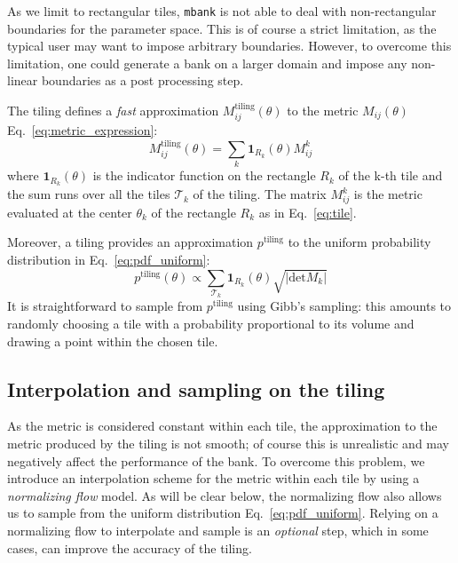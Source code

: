 \documentclass[twocolumn,showpacs,preprintnumbers,nofootinbib,prd,
superscriptaddress,10pt]{revtex4-2}
\begin{document}
As we limit to rectangular tiles, \texttt{mbank} is not able to deal with non-rectangular boundaries for the parameter space. This is of course a strict limitation, as the typical user may want to impose arbitrary boundaries. However, to overcome this limitation, one could generate a bank on a larger domain and impose any non-linear boundaries as a post processing step.

The tiling defines a {\it fast} approximation $M^{\text{tiling}}_{ij}(\theta)$ to the metric $M_{ij}(\theta)$ Eq.~\eqref{eq:metric_expression}:
\begin{equation}\label{eq:metric_tiling}
	M^\text{tiling}_{ij}(\theta) = \sum_{k} \mathbf{1}_{R_k}(\theta) M^{k}_{ij}
\end{equation}
where $\mathbf{1}_{R_k}(\theta)$ is the indicator function on the rectangle $R_k$ of the k-th tile and the sum runs over all the tiles $\mathcal{T}_k$ of the tiling. The matrix $M^{k}_{ij}$ is the metric evaluated at the center $\theta_k$ of the rectangle $R_k$ as in Eq.~\eqref{eq:tile}.

Moreover, a tiling provides an approximation $p^{\text{tiling}}$ to the uniform probability distribution in Eq.~\eqref{eq:pdf_uniform}:
\begin{equation}\label{eq:tiling_pdf}
	p^{\text{tiling}}(\theta) \propto \sum_{\mathcal{T}_k} \mathbf{1}_{R_k}(\theta) \sqrt{|\text{det} M_k|}
\end{equation}
It is straightforward to sample from $p^{\text{tiling}}$ using Gibb's sampling: this amounts to randomly choosing a tile with a probability proportional to its volume and drawing a point within the chosen tile.

\subsection{Interpolation and sampling on the tiling} \label{sec:normalizing_flow}

As the metric is considered constant within each tile, the approximation to the metric produced by the tiling is not smooth; of course this is unrealistic and may negatively affect the performance of the bank. To overcome this problem, we introduce an interpolation scheme for the metric within each tile by using a {\it normalizing flow} model. As will be clear below, the normalizing flow also allows us to sample from the uniform distribution Eq.~\eqref{eq:pdf_uniform}.
Relying on a normalizing flow to interpolate and sample is an {\it optional} step, which in some cases, can improve the accuracy of the tiling. 
\end{document}
